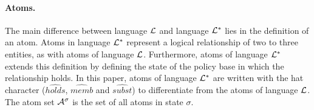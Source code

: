 \documentclass[11pt]{report}
\begin{document}
          \paragraph{Atoms.}

            The main difference between language ${\cal L}$ and language
            ${\cal L}^{*}$ lies in the definition of an atom. Atoms in language
            ${\cal L}^{*}$ represent a logical relationship of two to three
            entities, as with atoms of language ${\cal L}$. Furthermore, atoms
            of language ${\cal L}^{*}$ extends this definition by defining the
            state of the policy base in which the relationship holds. In this
            paper, atoms of language ${\cal L}^{*}$ are written with the
            hat character ($\hat{holds}$, $\hat{memb}$ and $\hat{subst}$) to
            differentiate from the atoms of language ${\cal L}$. The atom set
            ${\cal A}^{\sigma}$ is the set of all atoms in state $\sigma$.
\end{document}
